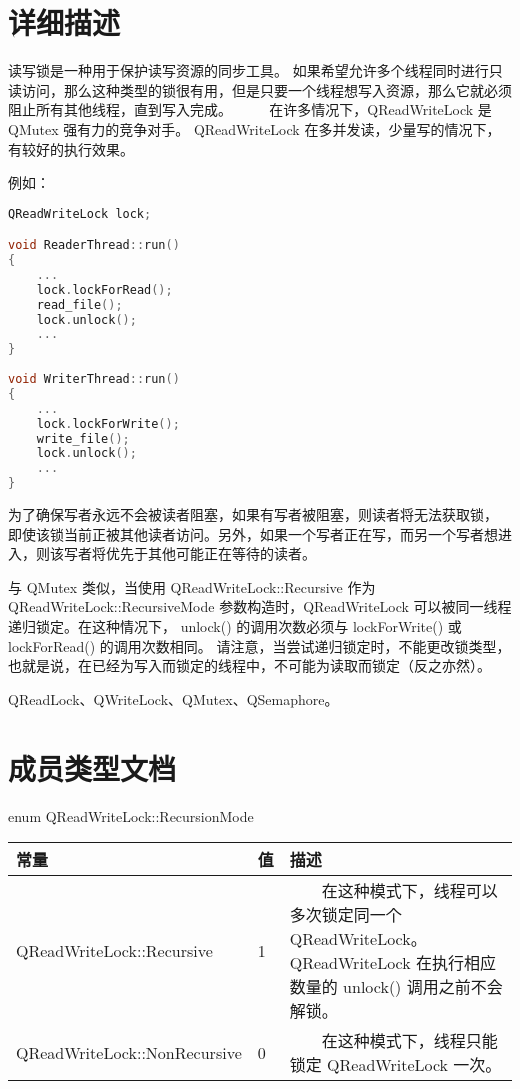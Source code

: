 \section{详细描述}

读写锁是一种用于保护读写资源的同步工具。
如果希望允许多个线程同时进行只读访问，那么这种类型的锁很有用，但是只要一个线程想写入资源，那么它就必须阻止所有其他线程，直到写入完成。
  
在许多情况下，QReadWriteLock 是 QMutex 强有力的竞争对手。
QReadWriteLock 在多并发读，少量写的情况下，有较好的执行效果。

例如：

\begin{lstlisting}[language=C++]
QReadWriteLock lock;

void ReaderThread::run()
{
    ...
    lock.lockForRead();
    read_file();
    lock.unlock();
    ...
}
    
void WriterThread::run()
{
    ...
    lock.lockForWrite();
    write_file();
    lock.unlock();
    ...
}
\end{lstlisting}

为了确保写者永远不会被读者阻塞，如果有写者被阻塞，则读者将无法获取锁，
即使该锁当前正被其他读者访问。另外，如果一个写者正在写，而另一个写者想进入，则该写者将优先于其他可能正在等待的读者。

与 QMutex 类似，当使用 QReadWriteLock::Recursive 作为 QReadWriteLock::RecursiveMode 参数构造时，QReadWriteLock 可以被同一线程递归锁定。在这种情况下，
unlock() 的调用次数必须与 lockForWrite() 或 lockForRead() 的调用次数相同。
请注意，当尝试递归锁定时，不能更改锁类型，也就是说，在已经为写入而锁定的线程中，不可能为读取而锁定（反之亦然）。

\begin{seeAlso}
QReadLock、QWriteLock、QMutex、QSemaphore。
\end{seeAlso}

\section{成员类型文档}

enum QReadWriteLock::RecursionMode

\begin{tabular}{|l|l|l|}
\hline
常量 &	值  &	描述 \\ 
\hline
QReadWriteLock::Recursive  &	1  &	  在这种模式下，线程可以多次锁定同一个 QReadWriteLock。QReadWriteLock 在执行相应数量的 unlock() 调用之前不会解锁。 \\ 
\hline
QReadWriteLock::NonRecursive &	0 	&  在这种模式下，线程只能锁定 QReadWriteLock 一次。 \\ 
\hline
\end{tabular}

